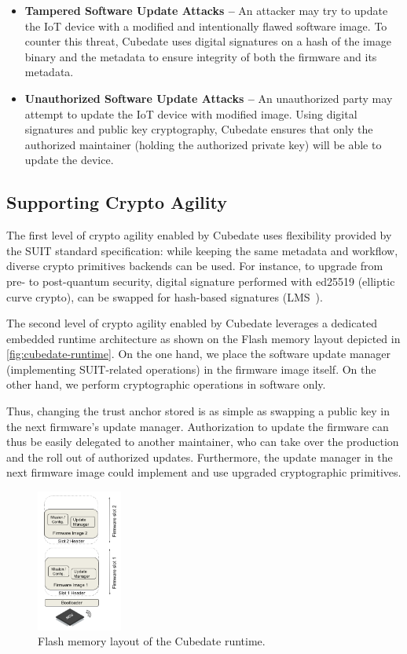 \begin{itemize}
\item {\bf Tampered Software Update Attacks –} An attacker may try to update the IoT device with a modified and intentionally flawed software image. To counter this threat, Cubedate uses digital signatures on a hash of the image binary and the metadata to ensure integrity of both the firmware and its metadata.

\item {\bf Unauthorized Software Update Attacks –} An unauthorized party may attempt to update the IoT device with modified image. Using digital signatures and public key cryptography, Cubedate ensures that only the authorized maintainer (holding the authorized private key) will be able to update the device.
\end{itemize}

\subsection{Supporting Crypto Agility}
The first level of crypto agility enabled by Cubedate uses flexibility provided by the SUIT standard specification: while keeping the same metadata and workflow, diverse crypto primitives backends can be used. For instance, to upgrade from pre- to post-quantum security, digital signature performed with ed25519 (elliptic curve crypto), can be swapped for hash-based signatures (LMS~\cite{banegas2022quantum-suit}).

The second level of crypto agility enabled by Cubedate leverages a dedicated embedded runtime architecture as shown on the Flash memory layout depicted in \autoref{fig:cubedate-runtime}. On the one hand, we place the software update manager (implementing SUIT-related operations) in the firmware image itself. On the other hand, we perform cryptographic operations in software only.

Thus, changing the trust anchor stored is as simple as swapping a public key in the next firmware's update manager.
Authorization to update the firmware can thus be easily  delegated to another maintainer, 
who can take over the production and the roll out of authorized updates.
Furthermore, the update manager in the next firmware image could
implement and use upgraded cryptographic primitives. 

\begin{figure}[t]
\begin{center}
    \includegraphics[width=0.25\textwidth]{Figures/Cubedate-slots.png}
    \caption{Flash memory layout of the Cubedate runtime.}
    \label{fig:cubedate-runtime}
\end{center}
\end{figure}

